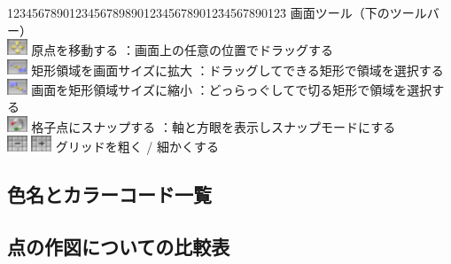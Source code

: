 \documentclass[papersize,a4paper,12pt,uplatex]{jsarticle}
\begin{document}
 \begin{tabbing}
1234567890123456789890123456789012\=34567890123\=\kill
画面ツール（下のツールバー）\\
\includegraphics[bb=0 0 6.48 5.04 , width=0.6cm]{Fig/translate-view.pdf}    原点を移動する   \>：画面上の任意の位置でドラッグする\\
\includegraphics[bb=0 0 6.48 5.04 , width=0.6cm]{Fig/zoom-in.pdf}    矩形領域を画面サイズに拡大   \>：ドラッグしてできる矩形で領域を選択する\\
\includegraphics[bb=0 0 6.48 5.04 , width=0.6cm]{Fig/zoom-out.pdf}    画面を矩形領域サイズに縮小   \>：どっらっぐしてで切る矩形で領域を選択する\\
\includegraphics[bb=0 0 6.48 5.04 , width=0.6cm]{Fig/snap.pdf}    格子点にスナップする \>：軸と方眼を表示しスナップモードにする\\
\includegraphics[bb=0 0 6.48 5.04 , width=0.6cm]{Fig/grid-more.pdf}  \includegraphics[bb=0 0 6.48 5.04 , width=0.6cm]{Fig/grid-less.pdf}    グリッドを粗く / 細かくする\\
 \end{tabbing}

\hypertarget{colorcodelist}{}
\subsection{色名とカラーコード一覧}
\vspace{\baselineskip}
\scalebox{0.9}{}

\newpage
\hypertarget{mkpttable}{}
\subsection{点の作図についての比較表}
\vspace{\baselineskip}
\scalebox{0.9}{}
\end{document}
